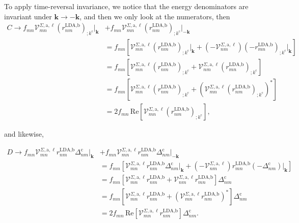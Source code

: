 \documentclass[letterpaper,aps]{revtex4}
\begin{document}
To apply time-reversal invariance,
we notice that the energy denominators are 
invariant under $\mathbf{k} \rightarrow - \mathbf{k}$, 
and then we only look at the numerators, then 
\begin{align}\label{ct}
C \rightarrow f_{mn}\mathcal{V}^{\Sigma,\text{a},\ell}_{mn}
    \left(r^{\text{LDA,b}}_{nm}\right)_{;k^{\text{c}}}\vert_{\mathbf{k}}
&+  f_{mn}\mathcal{V}^{\Sigma,\text{a},\ell}_{mn}
    \left(r^{\text{LDA,b}}_{nm}\right)_{;k^{\text{c}}}\vert_{-\mathbf{k}}\nonumber\\
&=  f_{mn}\left[\mathcal{V}^{\Sigma,\text{a},\ell}_{mn}
    \left(r^{\text{LDA,b}}_{nm}\right)_{;k^{\text{c}}}\vert_{\mathbf{k}} 
+   \left(-\mathcal{V}^{\Sigma,\text{a},\ell}_{nm}\right)
    \left(-r^{\text{LDA,b}}_{mn}\right)_{;k^{\text{c}}}\vert_{\mathbf{k}}\right]
    \nonumber\\
&= f_{mn}\left[\mathcal{V}^{\Sigma,\text{a},\ell}_{mn}
    \left(r^{\text{LDA,b}}_{nm}\right)_{;k^{\text{c}}}
+   \mathcal{V}^{\Sigma,\text{a},\ell}_{nm}
    \left(r^{\text{LDA,b}}_{mn}\right)_{;k^{\text{c}}}\right]\nonumber\\
&= f_{mn}\left[\mathcal{V}^{\Sigma,\text{a},\ell}_{mn} 
    \left(r^{\text{LDA,b}}_{nm}\right)_{;k^{\text{c}}}
+   \left(\mathcal{V}^{\Sigma,\text{a},\ell}_{mn}
    \left(r^{\text{LDA,b}}_{nm}\right)_{;k^{\text{c}}}\right)^*\right]\nonumber\\
&=  2f_{mn}\,\mathrm{Re}\left[\mathcal{V}^{\Sigma,\text{a},\ell}_{mn}
    \left(r^{\text{LDA,b}}_{nm}\right)_{;k^{\text{c}}}\right]
,
\end{align}

and likewise,

\begin{align}\label{dt}
D \rightarrow f_{mn}\mathcal{V}^{\Sigma,\text{a},\ell}_{mn}
    r^{\text{LDA,b}}_{nm}\Delta^{\text{c}}_{nm}\vert_{\mathbf{k}} 
&+  f_{mn}\mathcal{V}^{\Sigma,\text{a},\ell}_{mn}r^{\text{LDA,b}}_{nm}
    \Delta^{\text{c}}_{nm}\vert_{-\mathbf{k}}\nonumber\\
&=  f_{mn}\left[\mathcal{V}^{\Sigma,\text{a},\ell}_{mn}r^{\text{LDA,b}}_{nm}
    \Delta^{\text{c}}_{nm}\vert_{\mathbf{k}}
+   \left(-\mathcal{V}^{\Sigma,\text{a},\ell}_{nm}\right)r^{\text{LDA,b}}_{mn}
    \left(-\Delta^{\text{c}}_{nm}\right)\vert_{\mathbf{k}}\right]\nonumber\\
&=  f_{mn}\left[\mathcal{V}^{\Sigma,\text{a},\ell}_{mn}r^{\text{LDA,b}}_{nm}
+   \mathcal{V}^{\Sigma,\text{a},\ell}_{nm}r^{\text{LDA,b}}_{mn}\right]
    \Delta^{\text{c}}_{nm}\nonumber\\
&=  f_{mn}\left[\mathcal{V}^{\Sigma,\text{a},\ell}_{mn}r^{\text{LDA,b}}_{nm}
+   \left(\mathcal{V}^{\Sigma,\text{a},\ell}_{mn}
    r^{\text{LDA,b}}_{nm}\right)^*\right]\Delta^{\text{c}}_{nm}\nonumber\\
&=  2f_{mn}\,\mathrm{Re}\left[\mathcal{V}^{\Sigma,\text{a},\ell}_{mn}
    r^{\text{LDA,b}}_{nm}\right]\Delta^{\text{c}}_{nm}
.
\end{align}
\end{document}
